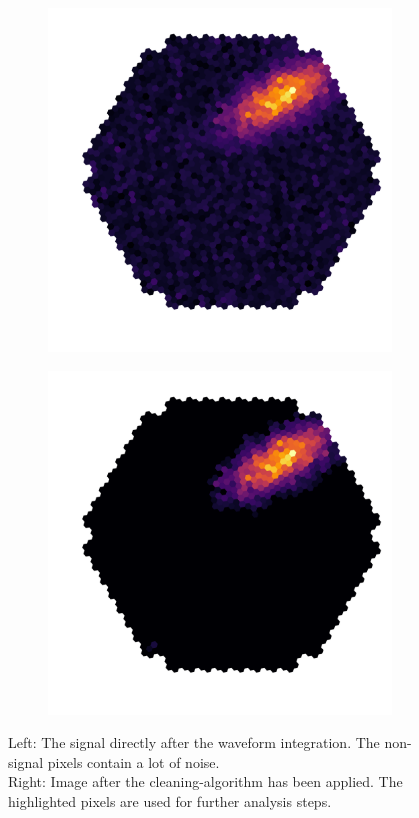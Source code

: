 \begin{figure}
	\centering
	\captionsetup{width=0.9\linewidth}
	\begin{subfigure}{.45\textwidth}
  		\centering
  		\includegraphics[width=\linewidth]{Plots/hillas_raw.pdf}
	\end{subfigure}%
	\begin{subfigure}{.45\textwidth}
 		\centering
		\includegraphics[width=\linewidth]{Plots/hillas_cleaned.pdf}
	\end{subfigure}
	\caption{
		Left: The signal directly after
		the waveform integration. The non-signal pixels contain a lot of noise. \\
		Right: Image after the cleaning-algorithm has been 
		applied. The highlighted pixels are used for further analysis steps.}
	\label{fig:shower_cleaning}
\end{figure}

